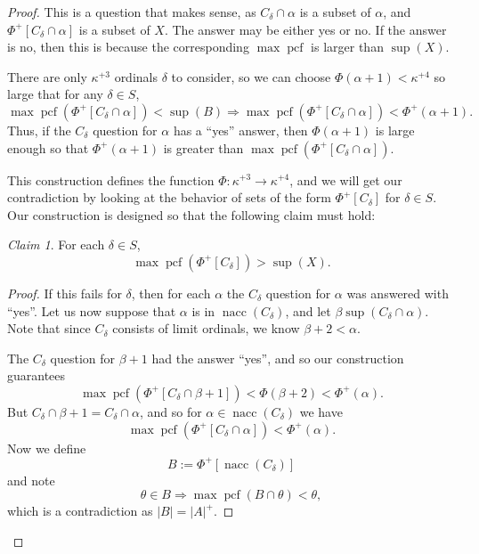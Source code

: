 \documentclass[10pt]{amsart}
\theoremstyle{plain}
\theoremstyle{definition}
\theoremstyle{remark}
\newtheorem*{claim}{Claim}
\DeclareMathOperator{\nacc}{nacc}
\DeclareMathOperator{\pcf}{pcf}
\numberwithin{equation}{section}
\begin{document}
\begin{proof}
This is a question that makes sense, as $C_\delta\cap \alpha$ is a subset of $\alpha$, and $\Phi^+[C_\delta\cap\alpha]$ is a subset of $X$.
The answer may be either yes or no.  If the answer is no, then this is because the corresponding $\max\pcf$ is larger than $\sup(X)$.

There are only $\kappa^{+3}$ ordinals $\delta$ to consider, so we can choose $\Phi(\alpha+1)<\kappa^{+4}$ so large that for any $\delta\in S$,
\begin{equation}
\max\pcf\left(\Phi^+[C_\delta\cap\alpha]\right)<\sup(B)\Longrightarrow \max\pcf\left(\Phi^+[C_\delta\cap\alpha]\right)<\Phi^+(\alpha+1).
\end{equation}
Thus, if the $C_\delta$ question for $\alpha$ has a ``yes'' answer, then $\Phi(\alpha+1)$ is large enough so that $\Phi^+(\alpha+1)$ is greater
than $\max\pcf(\Phi^+[C_\delta\cap\alpha])$.

This construction defines the function $\Phi:\kappa^{+3}\rightarrow\kappa^{+4}$, and we will get our contradiction by looking at the behavior
of sets of the form $\Phi^+[C_\delta]$ for $\delta\in S$.  Our construction is designed so that the following claim must hold:

\begin{claim}
For each $\delta\in S$,
\begin{equation}
\max\pcf\left(\Phi^+[C_\delta]\right)>\sup(X).
\end{equation}
\end{claim}
\begin{proof}
If this fails for $\delta$, then for each $\alpha$ the $C_\delta$ question for $\alpha$ was answered with ``yes''.  Let us now suppose that
$\alpha$ is in $\nacc(C_\delta)$, and let $\beta\sup(C_\delta\cap\alpha)$. Note that since $C_\delta$ consists of limit ordinals, we know $\beta+2<\alpha$.

The $C_\delta$ question for $\beta+1$ had the answer ``yes'', and
so our construction guarantees
\begin{equation}
\max\pcf\left(\Phi^+[C_\delta\cap\beta+1]\right)<\Phi(\beta+2)<\Phi^+(\alpha).
\end{equation}
But $C_\delta\cap\beta+1 = C_\delta\cap\alpha$, and so for $\alpha\in \nacc(C_\delta)$ we have
\begin{equation}
\max\pcf\left(\Phi^+[C_\delta\cap\alpha]\right)<\Phi^+(\alpha).
\end{equation}
Now we define
\begin{equation}
B:=\Phi^+[\nacc(C_\delta)]
\end{equation}
and note
\begin{equation}
\theta\in B\Longrightarrow \max\pcf(B\cap\theta)<\theta,
\end{equation}
which is a contradiction as $|B|=|A|^+$.
\end{proof}



\end{proof}
\end{document}
